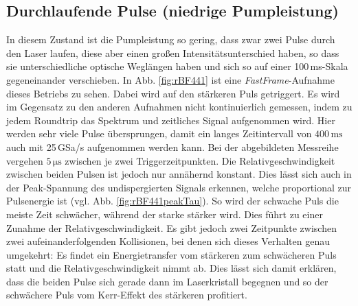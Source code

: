 \documentclass[bachelor,       %
               twoside,        %
               BCOR10mm,       %
               liststotoc,nomtotoc,bibtotoc, %
               english,ngerman, %
               final,          %
               ]{GAUBM}
\begin{document}
\subsection{Durchlaufende Pulse (niedrige Pumpleistung)}
\label{sec:running}
In diesem Zustand ist die Pumpleistung so gering, dass zwar zwei Pulse durch den Laser laufen, diese aber einen großen Intensitätsunterschied haben, so dass sie unterschiedliche optische Weglängen haben und sich so auf einer 100\,ms-Skala gegeneinander verschieben.
In Abb. \ref{fig:rBF441} ist eine \textit{FastFrame}-Aufnahme dieses Betriebs zu sehen.
Dabei wird auf den stärkeren Puls getriggert.
Es wird im Gegensatz zu den anderen Aufnahmen nicht kontinuierlich gemessen, indem zu jedem Roundtrip das Spektrum und zeitliches Signal aufgenommen wird.
Hier werden sehr viele Pulse übersprungen, damit ein langes Zeitintervall von $400\,\si{\milli\second}$ auch mit 25\,GSa/s  aufgenommen werden kann.
Bei der abgebildeten Messreihe vergehen $5\,\si{\micro\second}$ zwischen je zwei Triggerzeitpunkten.
Die Relativgeschwindigkeit zwischen beiden Pulsen ist jedoch nur annähernd konstant.
Dies lässt sich auch in der Peak-Spannung des undispergierten Signals erkennen, welche proportional zur Pulsenergie ist (vgl. Abb. \ref{fig:rBF441peakTau}).
So wird der schwache Puls die meiste Zeit schwächer, während der starke stärker wird.
Dies führt zu einer Zunahme der Relativgeschwindigkeit.
Es gibt jedoch zwei Zeitpunkte zwischen zwei aufeinanderfolgenden Kollisionen, bei denen sich dieses Verhalten genau umgekehrt: Es findet ein Energietransfer vom stärkeren zum schwächeren Puls statt und die Relativgeschwindigkeit nimmt ab.
Dies lässt sich damit erklären, dass die beiden Pulse sich gerade dann im Laserkristall begegnen und so der schwächere Puls vom Kerr-Effekt des stärkeren profitiert.
\end{document}
